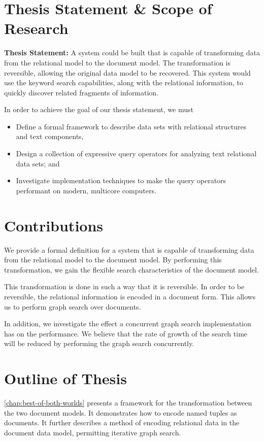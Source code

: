 	\section{Thesis Statement \& Scope of Research}
		\begin{displayquote}
			\textbf{Thesis Statement:}  A system could be built that is capable of transforming data from the relational model to the document model.  The transformation is reversible, allowing the original data model to be recovered.  This system would use the keyword search capabilities, along with the relational information, to quickly discover related fragments of information.
		\end{displayquote}
		
		In order to achieve the goal of our thesis statement, we must
		
		\begin{itemize}
			\item Define a formal framework to describe data sets with relational structures and text components,
			\item Design a collection of expressive query operators for analyzing text relational data sets; and
			\item Investigate implementation techniques to make the query operators performant on modern, multicore computers.
		\end{itemize}
		
	 \section{Contributions}
	 	We provide a formal definition for a system that is capable of transforming data from the relational model to the document model.  By performing this transformation, we gain the flexible search characteristics of the document model.
	 	
	 	This transformation is done in such a way that it is reversible.  In order to be reversible, the relational information is encoded in a document form.  This allows us to perform graph search over documents.
	 	
	 	In addition, we investigate the effect a concurrent graph search implementation has on the performance.  We believe that the rate of growth of the search time will be reduced by performing the graph search concurrently.
	
	\section{Outline of Thesis}
		\cref{chap:best-of-both-worlds} presents a framework for the transformation between the two document models.  It demonstrates how to encode named tuples as documents.  It further describes a method of encoding relational data in the document data model, permitting iterative graph search.
		
